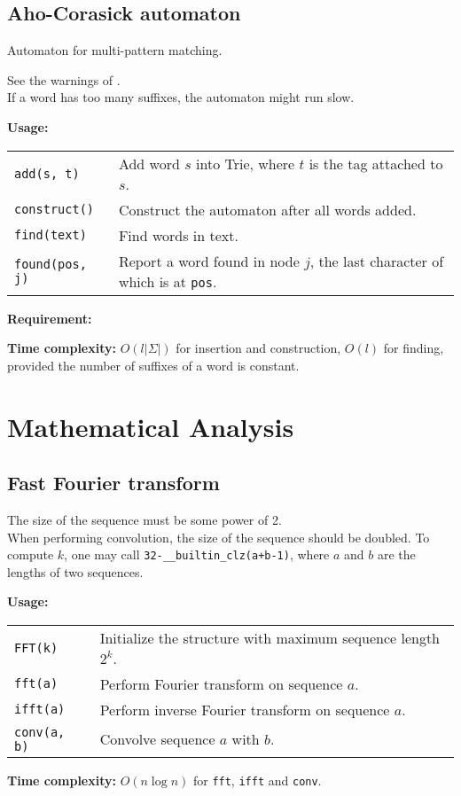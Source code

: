 \subsection{Aho-Corasick automaton}
Automaton for multi-pattern matching. \par
\Warning See the warnings of . \\
\Warning If a word has too many suffixes, the automaton might run slow. \par
\textbf{Usage:} \\[0.1cm]
\begin{tabular}{p{2.5cm} p{9cm}}
  \lstinline|add(s, t)| & Add word $s$ into Trie, where $t$ is the tag attached to $s$.  \\
  \lstinline|construct()| & Construct the automaton after all words added. \\
  \lstinline|find(text)| & Find words in text. \\
  \lstinline|found(pos, j)| & Report a word found in node $j$, the last character of which is at \lstinline|pos|. \\
\end{tabular} \par
\textbf{Requirement:} \\
 \par
\textbf{Time complexity:} $O(l|\Sigma|)$ for insertion and construction, $O(l)$ for finding, provided the number of suffixes of a word is constant. \par


\section{Mathematical Analysis}
\subsection{Fast Fourier transform}
\Warning The size of the sequence must be some power of 2. \\
\Warning When performing convolution, the size of the sequence should be doubled. To compute $k$, one may call \lstinline|32-__builtin_clz(a+b-1)|, where $a$ and $b$ are the lengths of two sequences.  \par
\textbf{Usage:} \\[0.1cm]
\begin{tabular}{p{2cm} p{9.5cm}}
  \lstinline|FFT(k)| & Initialize the structure with maximum sequence length $2^k$. \\
  \lstinline|fft(a)| & Perform Fourier transform on sequence $a$.  \\
  \lstinline|ifft(a)| & Perform inverse Fourier transform on sequence $a$. \\
  \lstinline|conv(a, b)| & Convolve sequence $a$ with $b$. \\
\end{tabular} \par
\textbf{Time complexity:} $O(n \log n)$ for \lstinline|fft|, \lstinline|ifft| and \lstinline|conv|. \par


